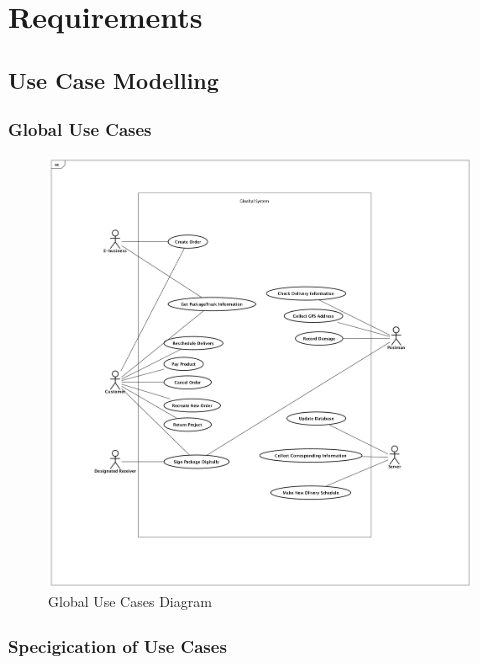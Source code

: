 \documentclass[12pt]{scrreprt}
\begin{document}
\chapter{Requirements}
\section{Use Case Modelling}
\subsection{Global Use Cases}
\begin{figure}[H]
  \centering\includegraphics[width=5.5in]{DocumentRes/0UseCaseDiagram.png}
  \caption{Global Use Cases Diagram}
\end{figure}

\subsection{Specigication of Use Cases}
\end{document}
